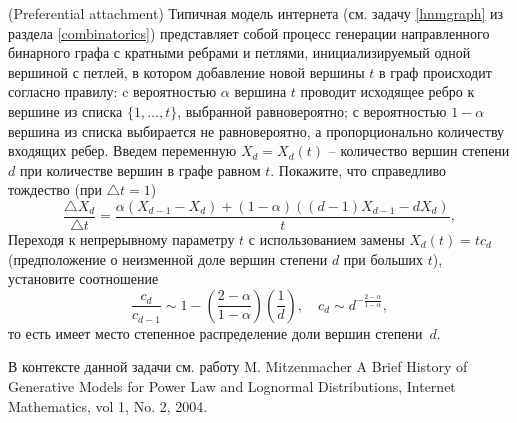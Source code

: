 \begin{problem}(Preferential attachment)
\label{pref_attach}
Типичная модель интернета (см. задачу \ref{hnmgraph} из раздела \ref{combinatorics})
представляет собой  процесс генерации направленного бинарного графа с кратными ребрами и петлями, инициализируемый одной вершиной с петлей, в котором добавление новой  вершины $t$ в граф происходит согласно правилу:  c вероятностью $\alpha$ вершина $t$ проводит исходящее ребро к вершине из списка $\{1,\ldots,t\}$, выбранной равновероятно; с вероятностью $1- \alpha$ вершина из списка выбирается не равновероятно, а пропорционально количеству входящих ребер. 
Введем переменную $X_d = X_d(t)$ -- количество вершин степени $d$ при количестве вершин в графе равном $t$.  Покажите, что справедливо тождество (при $\triangle t = 1$)
\[
\frac{\triangle X_d}{\triangle t} = \frac{\alpha (X_{d-1} - X_d) + (1- \alpha) ( (d-1)X_{d-1}  - dX_d )}{t},
\]     
Переходя к непрерывному параметру $t$ с использованием замены $X_d(t) = t c_d $ (предположение о неизменной доле вершин степени $d$ при больших $t$), установите соотношение
\[
\frac{c_d}{c_{d-1}} \sim 1- \left( \frac{2 - \alpha}{1 - \alpha} \right) \left( \frac{1}{d} \right), 
\quad c_d \sim   d^{ -\frac{2 -\alpha}{1 -\alpha}},
\]
то есть имеет место степенное распределение доли вершин степени~$d$.
\end{problem}

\begin{remark}
В контексте данной задачи см. работу M. Mitzenmacher 
A Brief History of Generative Models for Power Law and Lognormal Distributions,
Internet Mathematics, vol 1, No. 2, 2004. 
\end{remark}



